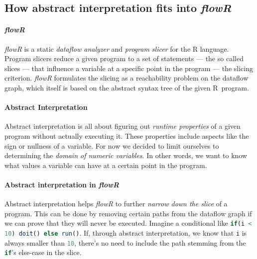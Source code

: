 \documentclass[color,coloraccent=red!60!black,listings]{poster}
\def\flowr{\textit{flowR}}
\def\rc#1{\lstinline[language=r]{#1}}
\begin{document}
\begin{multicols}{3}
	\begin{minipage}{\dimexpr2\columnwidth+\columnsep\relax}
		\section*{How abstract interpretation fits into \flowr}
		\paragraph{\flowr}\flowr{} is a static \emph{dataflow analyzer} and
		\emph{program slicer} for the R language. Program slicers reduce a given program
		to a set of statements --- the so called slices --- that influence a variable at
		a specific point in the program --- the slicing criterion. \flowr{} formulates
		the slicing as a reachability problem on the dataflow graph, which itself is
		based on the abstract syntax tree of the given R~program.
		\paragraph{Abstract Interpretation} Abstract interpretation is all about
		figuring out \emph{runtime properties} of a given program without actually
		executing it. These properties include aspects like the sign or nullness of a
		variable. For now we decided to limit ourselves to determining the \emph{domain
		of numeric variables}. In other words, we want to know what values a variable
		can have at a certain point in the program.
		\paragraph{Abstract interpretation in \flowr} Abstract interpretation helps
		\flowr{} to further \emph{narrow down the slice} of a program. This can be done
		by removing certain paths from the dataflow graph if we can prove that they will
		never be executed. Imagine a conditional like \rc{if(i < 10) doit() else run()}.
		If, through abstract interpretation, we know that \rc{i} is always smaller than
		\rc{10}, there's no need to include the path stemming from the \rc{if}'s
		else-case in the slice. %

\end{minipage}
\end{multicols}
\end{document}
